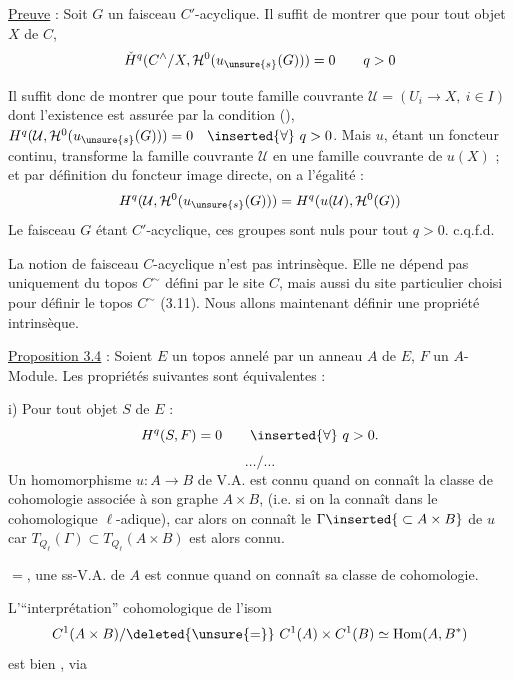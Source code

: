 
\uline{Preuve} : Soit $G$ un faisceau $C'$-acyclique. Il suffit de montrer que pour tout objet $X$ de $C$,
\[
\check H^q(C^{\wedge}/X,\mathcal H^0(u_{\unsure{s}}(G)))=0\qquad q>0
\]

Il suffit donc de montrer que pour toute famille couvrante
$\mathcal U=(U_i\longrightarrow X,\ i\in I)$ dont l'existence est assurée par la condition (),
$H^q(\mathcal U,\mathcal H^0(u_{\unsure{s}}(G)))=0\quad\inserted{\forall}\ q>0$.
Mais $u$, étant un foncteur continu, transforme la famille couvrante $\mathcal U$ en une famille couvrante de $u(X)$ ; et par définition du foncteur image directe, on a l'égalité :
\[
H^q(\mathcal U,\mathcal H^0(u_{\unsure{s}}(G)))=H^q(u(\mathcal U),\mathcal H^0(G))
\]
\margin{$\unsure{\forall\ \longrightarrow}$}
Le faisceau $G$ étant $C'$-acyclique, ces groupes sont nuls pour tout $q>0$. c.q.f.d.

La notion de faisceau $C$-acyclique n'est pas intrinsèque.
Elle ne dépend pas uniquement du topos $C^{\sim}$ défini par le site $C$, mais aussi du site particulier choisi pour définir le topos $C^{\sim}$ (3.11).
Nous allons maintenant définir une propriété intrinsèque.

\uline{Proposition 3.4} : Soient $E$ un topos annelé par un anneau $A$ de $E$, $F$ un $A$-Module. Les propriétés suivantes sont équivalentes :

i) Pour tout objet $S$ de $E$ :
\[
H^q(S,F)=0\qquad\inserted{\forall}\ q>0.
\]
\[\ldots/\ldots\]
Un homomorphisme $u:A\longrightarrow B$ de V.A. est connu quand on connaît la classe de cohomologie associée à son graphe  $A\times B$,
 (i.e. si on la connaît   dans le  cohomologique $\ell$-adique), car alors on connaît le  $\Gamma\inserted{{}\subset A\times B}$ de $u$ car $T_{Q_\ell}(\Gamma)\subset T_{Q_\ell}(A\times B)$ est alors connu.

\uline{} $=$, une ss-V.A. de $A$ est connue quand on connaît sa classe de cohomologie.

L'``interprétation'' cohomologique de l'isom
\[
C^1(A\times B)/\deleted{\unsure{=}}\ C^1(A)\times C^1(B)\simeq\operatorname{Hom}(A,B^*)
\]
est bien , via

